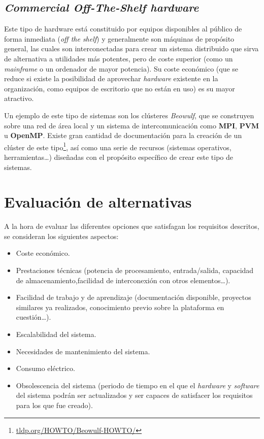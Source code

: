 \subsection{\textit{Commercial Off-The-Shelf hardware}}

Este tipo de hardware está constituido por equipos disponibles al público de forma inmediata (\textit{off the shelf}) y generalmente son máquinas de propósito general, las cuales son interconectadas para crear un sistema distribuido que sirva de alternativa a utilidades más potentes, pero de coste superior (como un \textit{mainframe} o un ordenador de mayor potencia). Su coste económico (que se reduce si existe la posibilidad de aprovechar \textit{hardware} existente en la organización, como equipos de escritorio que no están en uso) es su mayor atractivo.

Un ejemplo de este tipo de sistemas son los clústeres \textit{Beowulf}\cite{beowulf:icpp95}, que se construyen sobre una red de área local y un sistema de intercomunicación como \textbf{MPI}, \textbf{PVM} u \textbf{OpenMP}. Existe gran cantidad de documentación para la creación de un clúster de este tipo\footnote{\href{http://tldp.org/HOWTO/Beowulf-HOWTO/}{tldp.org/HOWTO/Beowulf-HOWTO/}}, así como una serie de recursos (sistemas operativos, herramientas\dots) diseñadas con el propósito específico de crear este tipo de sistemas.


\section{Evaluación de alternativas}
\label{alternativas}
A la hora de evaluar las diferentes opciones que satisfagan los requisitos descritos, se consideran los siguientes aspectos:

\begin{itemize}
  \item Coste económico.
  \item Prestaciones técnicas (potencia de procesamiento, entrada/salida, capacidad de almacenamiento,facilidad de interconexión con otros elementos\dots).
  \item Facilidad de trabajo y de aprendizaje (documentación disponible, proyectos similares ya realizados, conocimiento previo sobre la plataforma en cuestión\dots).
  \item Escalabilidad del sistema.
  \item Necesidades de mantenimiento del sistema.
  \item Consumo eléctrico.
  \item Obsolescencia del sistema (periodo de tiempo en el que el \textit{hardware} y \textit{software} del sistema podrán ser actualizados y ser capaces de satisfacer los requisitos para los que fue creado).
\end{itemize}

